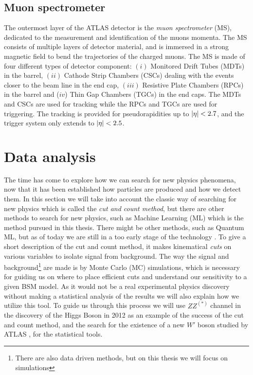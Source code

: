 \documentclass[12pt, a4paper]{book}
\begin{document}
\subsection{Muon spectrometer}\label{sec:MS}
The outermost layer of the ATLAS detector is the \textit{muon spectrometer} (MS), dedicated to the measurement and identification of the muons momenta. The MS consists of multiple layers of detector material, 
and is immersed in a strong magnetic field to bend the trajectories of the charged muons. The MS is made of four different types of detector component: $(i)$ Monitored Drift Tubes (MDTs) in the barrel, 
$(ii)$ Cathode Strip Chambers (CSCs) dealing with the events closer to the beam line in the end cap, $(iii)$ Resistive Plate Chambers (RPCs) in the barrel and ($iv$) Thin Gap Chambers (TGCs) in the end caps. 
The MDTs and CSCs are used for tracking while the RPCs and TGCs are used for triggering. The tracking is provided for pseudorapidities up to $\abs{\eta}<2.7$, and the trigger system only extends to $\abs{\eta}<2.5$.

\section{Data analysis}\label{sec:data_anal}
The time has come to explore how we can search for new physics phenomena, now that it has been established how particles are produced and how we detect them. In this section we will take into account the classic way of searching for new physics which is called 
the \textit{cut and count method}, but there are other methods to search for new physics, such as Machine Learning (ML) which is the method pursued in this thesis. There might be other methods, such as 
Quantum ML, but as of today we are still in a too early stage of the technology \cite{QML}. To give a short description of the cut and count method, it makes kinematical \textit{cuts} on various variables to isolate signal from background. The way 
the signal and background\footnote{There are also data driven methods, but on this thesis we will focus on simulations} are made is by Monte Carlo (MC) simulations, which is necessary for guiding us on where to place efficient cuts and understand our sensitivity to a given BSM model. As it would not be a real experimental physics discovery without making a statistical 
analysis of the results we will also explain how we utilize this tool. To guide us through this process we will use $ZZ^{(*)}$ channel in the discovery of the Higgs Boson in 2012 \cite{Higgs_discovery_2012} as an example of the success of the cut and count method, and 
the search for the existence of a new $W'$ boson studied by ATLAS \cite{Stat}, for the statistical tools.
\end{document}
